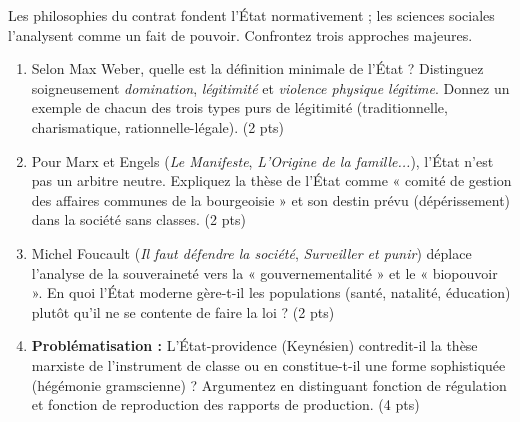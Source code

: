 \documentclass[11pt]{article}
\begin{document}
\begin{exercice}
Les philosophies du contrat fondent l'État normativement ; les sciences sociales l'analysent comme un fait de pouvoir. Confrontez trois approches majeures.

\begin{enumerate}
    \item Selon Max Weber, quelle est la définition minimale de l'État ? Distinguez soigneusement \emph{domination}, \emph{légitimité} et \emph{violence physique légitime}. Donnez un exemple de chacun des trois types purs de légitimité (traditionnelle, charismatique, rationnelle-légale). (2 pts)
    \item Pour Marx et Engels (\emph{Le Manifeste}, \emph{L'Origine de la famille...}), l'État n'est pas un arbitre neutre. Expliquez la thèse de l'État comme « comité de gestion des affaires communes de la bourgeoisie » et son destin prévu (dépérissement) dans la société sans classes. (2 pts)
    \item Michel Foucault (\emph{Il faut défendre la société}, \emph{Surveiller et punir}) déplace l'analyse de la souveraineté vers la « gouvernementalité » et le « biopouvoir ». En quoi l'État moderne gère-t-il les populations (santé, natalité, éducation) plutôt qu'il ne se contente de faire la loi ? (2 pts)
    \item \textbf{Problématisation :} L'État-providence (Keynésien) contredit-il la thèse marxiste de l'instrument de classe ou en constitue-t-il une forme sophistiquée (hégémonie gramscienne) ? Argumentez en distinguant fonction de régulation et fonction de reproduction des rapports de production. (4 pts)
\end{enumerate}
\end{exercice}
\end{document}
